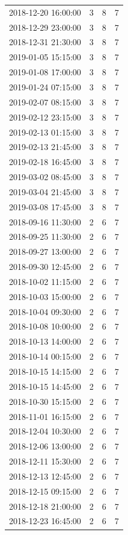 \begin{tabular}{lrrr}
2018-12-20 16:00:00 & 3 & 8 & 7 \\
2018-12-29 23:00:00 & 3 & 8 & 7 \\
2018-12-31 21:30:00 & 3 & 8 & 7 \\
2019-01-05 15:15:00 & 3 & 8 & 7 \\
2019-01-08 17:00:00 & 3 & 8 & 7 \\
2019-01-24 07:15:00 & 3 & 8 & 7 \\
2019-02-07 08:15:00 & 3 & 8 & 7 \\
2019-02-12 23:15:00 & 3 & 8 & 7 \\
2019-02-13 01:15:00 & 3 & 8 & 7 \\
2019-02-13 21:45:00 & 3 & 8 & 7 \\
2019-02-18 16:45:00 & 3 & 8 & 7 \\
2019-03-02 08:45:00 & 3 & 8 & 7 \\
2019-03-04 21:45:00 & 3 & 8 & 7 \\
2019-03-08 17:45:00 & 3 & 8 & 7 \\
2018-09-16 11:30:00 & 2 & 6 & 7 \\
2018-09-25 11:30:00 & 2 & 6 & 7 \\
2018-09-27 13:00:00 & 2 & 6 & 7 \\
2018-09-30 12:45:00 & 2 & 6 & 7 \\
2018-10-02 11:15:00 & 2 & 6 & 7 \\
2018-10-03 15:00:00 & 2 & 6 & 7 \\
2018-10-04 09:30:00 & 2 & 6 & 7 \\
2018-10-08 10:00:00 & 2 & 6 & 7 \\
2018-10-13 14:00:00 & 2 & 6 & 7 \\
2018-10-14 00:15:00 & 2 & 6 & 7 \\
2018-10-15 14:15:00 & 2 & 6 & 7 \\
2018-10-15 14:45:00 & 2 & 6 & 7 \\
2018-10-30 15:15:00 & 2 & 6 & 7 \\
2018-11-01 16:15:00 & 2 & 6 & 7 \\
2018-12-04 10:30:00 & 2 & 6 & 7 \\
2018-12-06 13:00:00 & 2 & 6 & 7 \\
2018-12-11 15:30:00 & 2 & 6 & 7 \\
2018-12-13 12:45:00 & 2 & 6 & 7 \\
2018-12-15 09:15:00 & 2 & 6 & 7 \\
2018-12-18 21:00:00 & 2 & 6 & 7 \\
2018-12-23 16:45:00 & 2 & 6 & 7 \\

\end{tabular}
